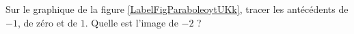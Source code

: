 
\begin{exercice}\label{exoPremiere-0059}

    Sur le graphique de la figure \ref{LabelFigParaboleoytUKk}, tracer les antécédents de \( -1\), de zéro et de \( 1\). Quelle est l'image de \( -2\) ?
\newcommand{\CaptionFigParaboleoytUKk}{Pour information, cette courbe est \( f(x)=2x^2+4x+2\).}


\end{exercice}
